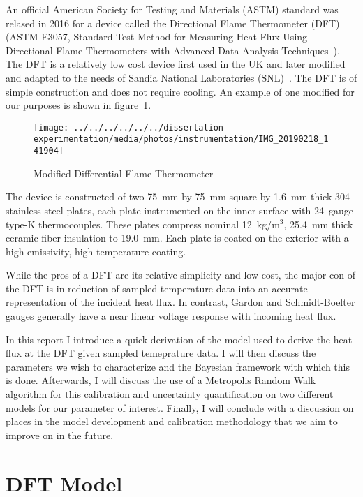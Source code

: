 \documentclass[article]{proc}
\begin{document}
    An official American Society for Testing and Materials (ASTM) standard was relased in 2016 for a device called the Directional Flame Thermometer (DFT) (ASTM E3057, Standard Test Method for Measuring Heat Flux Using Directional Flame Thermometers with Advanced Data Analysis Techniques~\cite{astm:3057}). The DFT is a relatively low cost device first used in the UK and later modified and adapted to the needs of Sandia National Laboratories (SNL)~\cite{Fry:1989,Nakos:2018}. The DFT is of simple construction and does not require cooling. An example of one modified for our purposes is shown in figure~\ref{fig:dft}. 

    \begin{figure}[h!]
        \centering
        \texttt{[image: ../../../../../../dissertation-experimentation/media/photos/instrumentation/IMG\_20190218\_141904]}
        \caption{Modified Differential Flame Thermometer}
        \label{fig:dft}
    \end{figure}

    The device is constructed of two 75~mm by 75~mm square by 1.6~mm thick 304 stainless steel plates, each plate instrumented on the inner surface with 24~gauge type-K thermocouples. These plates compress nominal 12~kg/m$^3$, 25.4~mm thick ceramic fiber insulation to 19.0~mm. Each plate is coated on the exterior with a high emissivity, high temperature coating. 

    While the pros of a DFT are its relative simplicity and low cost, the major con of the DFT is in reduction of sampled temperature data into an accurate representation of the incident heat flux. In contrast, Gardon and Schmidt-Boelter gauges generally have a near linear voltage response with incoming heat flux.

    In this report I introduce a quick derivation of the model used to derive the heat flux at the DFT given sampled temeprature data. I will then discuss the parameters we wish to characterize and the Bayesian framework with which this is done. Afterwards, I will discuss the use of a Metropolis Random Walk algorithm for this calibration and uncertainty quantification on two different models for our parameter of interest. Finally, I will conclude with a discussion on places in the model development and calibration methodology that we aim to improve on in the future.

\section{DFT Model}
\end{document}
